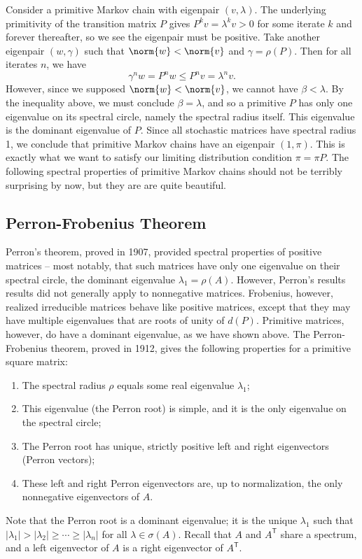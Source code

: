 \documentclass[11pt,letterpaper]{amsart}
\newcommand{\transpose}[1]{#1^{\mathsf{T}}}
\begin{document}
Consider a primitive Markov chain with eigenpair $(v, \lambda)$. The underlying
primitivity of the transition matrix $P$ gives $P^k v = \lambda^k v > 0$ for
some iterate $k$ and forever thereafter, so we see the eigenpair must be
positive. Take another eigenpair $(w, \gamma)$ such that $\norm{w} < \norm{v}$
and $\gamma = \rho(P)$. Then for all iterates $n$, we have
\begin{equation*}
  \gamma^n w = P^n w \leq P^n v = \lambda^n v.
\end{equation*}
However, since we supposed $\norm{w} < \norm{v}$, we cannot have
$\beta < \lambda$. By the inequality above, we must conclude $\beta = \lambda$,
and so a primitive $P$ has only one eigenvalue on its spectral circle, namely
the spectral radius itself. This eigenvalue is the dominant eigenvalue of $P$.
Since all stochastic matrices have spectral radius 1, we conclude that primitive
Markov chains have an eigenpair $(1, \pi)$. This is exactly what we want to
satisfy our limiting distribution condition $\pi = \pi P$. The following
spectral properties of primitive Markov chains should not be terribly surprising
by now, but they are are quite beautiful.


\subsection{Perron-Frobenius Theorem}
Perron's theorem, proved in 1907, provided spectral properties of positive
matrices -- most notably, that such matrices have only one eigenvalue on their
spectral circle, the dominant eigenvalue $\lambda_1=\rho(A)$. However, Perron's
results results did not generally apply to nonnegative matrices. Frobenius,
however, realized irreducible matrices behave like positive matrices, except
that they may have multiple eigenvalues that are roots of unity of $d(P)$.
Primitive matrices, however, do have a dominant eigenvalue, as we have shown
above. The Perron-Frobenius theorem, proved in 1912, gives the following
properties for a primitive square matrix:
\begin{enumerate}
\item The spectral radius $\rho$ equals some real eigenvalue $\lambda_1$;
\item This eigenvalue (the Perron root) is simple, and it is the only eigenvalue on the spectral circle;
\item The Perron root has unique, strictly positive left and right eigenvectors (Perron vectors);
\item These left and right Perron eigenvectors are, up to normalization, the only nonnegative eigenvectors of $A$.
\end{enumerate}
Note that the Perron root is a dominant eigenvalue; it is the unique $\lambda_1$
such that $|\lambda_1|>|\lambda_2|\geq\cdots\geq |\lambda_{n}|$ for all
$\lambda \in \sigma(A)$. Recall that $A$ and $\transpose{A}$ share a spectrum,
and a left eigenvector of $A$ is a right eigenvector of $\transpose{A}$.
\end{document}
